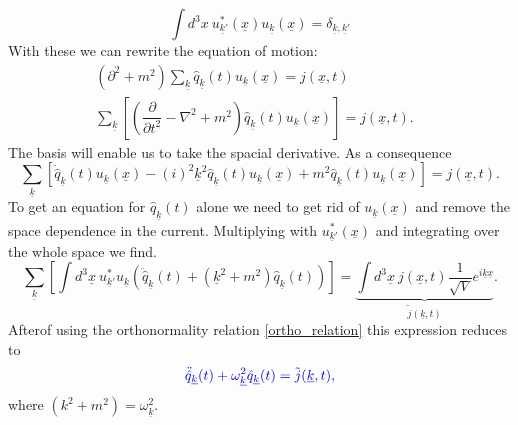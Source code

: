 \documentclass[12pt, titlepage]{article}
\begin{document}
\begin{equation}\label{ortho_relation}
\int d^{3}x \ 
u^{\ast}_{\underline{k}'}(\underline{x})
u_{\underline{k}}(\underline{x})
=
\delta_{\underline{k}, \underline{k}'}
\end{equation}
With these we can rewrite the equation of motion:
\begin{subequations}
\begin{align}
\left(
\partial^{2}+m^{2}
 \right)
 \sum_{\underline{k}} \hat{q}_{\underline{k}}(t)u_{\underline{k}}(\underline{x})
 =j(\underline{x},t)
	&\\
 \sum_{\underline{k}}
 \left[ 
	\left( 
	\dfrac{\partial}{\partial t^{2}}
	-\nabla^{2}
	+m^{2}
	\right)  
	\hat{q}_{\underline{k}}(t)u_{\underline{k}}(\underline{x})
 \right] 
 =j(\underline{x},t).
\end{align}
\end{subequations}
The basis will enable us to take the spacial derivative. As a consequence  
\begin{equation}
 \sum_{\underline{k}}
 \left[ 
	\ddot{\hat{q}}_{\underline{k}}(t)u_{\underline{k}}(\underline{x})
	-(i)^{2}\underline{k}^{2}\hat{q}_{\underline{k}}(t)u_{\underline{k}}(\underline{x})
	+m^{2}\hat{q}_{\underline{k}}(t)u_{\underline{k}}(\underline{x})
 \right] 
  =j(\underline{x},t).
\end{equation}
To get an equation for $ \hat{q}_{\underline{k}}(t) $ alone we need to get rid of $ u_{\underline{k}}(\underline{x}) $ and remove the space dependence in the current. Multiplying with $ u^{\ast}_{\underline{k}'}(\underline{x}) $ and integrating over the whole space we find.
\begin{equation}
 \sum_{\underline{k}}
 \left[ 
 \int d^{3}\underline{x} \ u^{\ast}_{\underline{k}'}u_{\underline{k}}
 \left( 
 \ddot{\hat{q}}_{\underline{k}}(t) 
 +
 \left( \underline{k}^{2}+m^{2}\right) 
 \hat{q}_{\underline{k}}(t) 
 \right) 
  \right] 
  ={\underbrace{\int d^{3}\underline{x} \ 
j(\underline{x},t) \dfrac{1}{\sqrt{V}} e^{i\underline{k}\underline{x}}}_{\tilde{j}(\underline{k},t)}}
  .
\end{equation}
Afterof using the orthonormality relation \eqref{ortho_relation} this expression reduces to
\begin{equation}\label{eq_for_q}
 \textcolor[RGB]{0,0,204}{
\ddot{\hat{q}}_{\underline{k}}(t) 
 +
\omega_{\underline{k}}^{2}
 \hat{q}_{\underline{k}}(t) 
  =\tilde{j}(\underline{k},t)
  ,}
\end{equation}
where  $ (k^{2}+m^{2}) = \omega_{\underline{k}}^{2} $.
\end{document}
